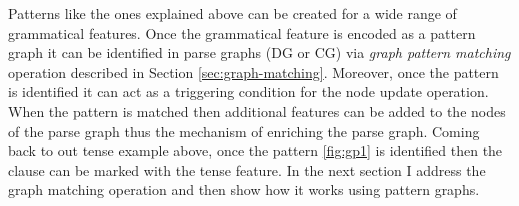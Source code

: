 
%
%


Patterns like the ones explained above can be created for a wide range of grammatical features. Once the grammatical feature is encoded as a pattern graph it can be identified in parse graphs (DG or CG) via \textit{graph pattern matching} operation described in Section \ref{sec:graph-matching}. Moreover, once the pattern is identified it can act as a triggering condition for the node update operation. When the pattern is matched then additional features can be added to the nodes of the parse graph thus the mechanism of enriching the parse graph. Coming back to out tense example above, once the pattern \ref{fig:gp1} is identified then the clause can be marked with the tense feature. In the next section I address the graph matching operation and then show how it works using pattern graphs. 


